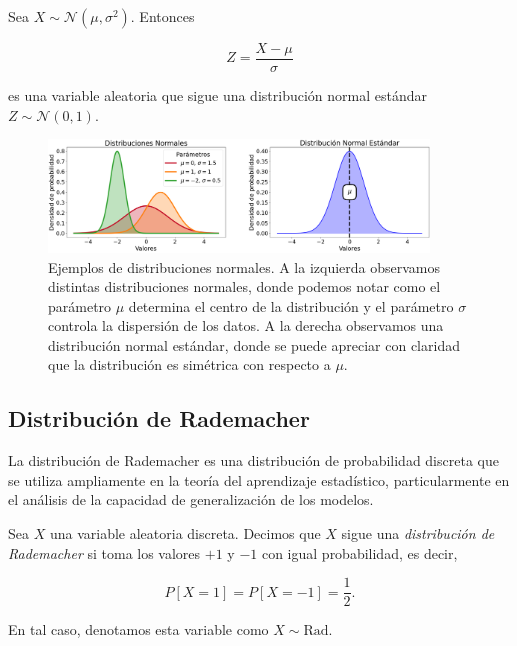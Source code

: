 \begin{proposicion}
    Sea $X \sim \mathcal{N}(\mu,\sigma^2)$. Entonces
    
    \[ Z = \frac{X-\mu}{\sigma} \]

    es una variable aleatoria que sigue una distribución normal estándar $Z \sim\mathcal{N}(0,1)$.
\end{proposicion}

\begin{figure}[h]
    \centering
    \includegraphics[width=0.9\textwidth]{img/distribuciones-normales.png}
    \caption[Ejemplos de distribuciones normales.] {Ejemplos de distribuciones normales. A la izquierda observamos distintas distribuciones normales, donde podemos notar como el parámetro $\mu$ determina el centro de la distribución y el parámetro $\sigma$ controla la dispersión de los datos. A la derecha observamos una distribución normal estándar, donde se puede apreciar con claridad que la distribución es simétrica con respecto a $\mu$.}\label{fig:distribuciones-normales}
\end{figure}

\subsection{Distribución de Rademacher}\label{subsec:distribucion-rademacher}
La distribución de Rademacher es una distribución de probabilidad discreta que se utiliza ampliamente en la teoría del aprendizaje estadístico, particularmente en el análisis de la capacidad de generalización de los modelos.

\begin{definicion}
    Sea $X$ una variable aleatoria discreta. Decimos que $X$ sigue una \emph{distribución de Rademacher} si toma los valores $+1$ y $-1$ con igual probabilidad, es decir,

    \[
        P[X = 1] = P[X = -1] = \frac{1}{2}.
    \]

    En tal caso, denotamos esta variable como $X \sim \text{Rad}$.
\end{definicion}

